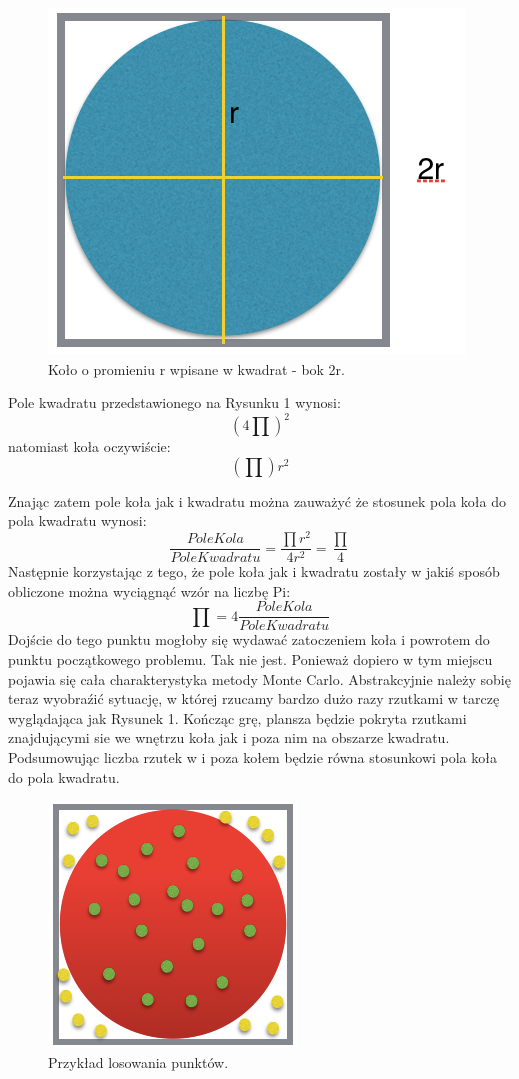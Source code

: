 \documentclass[a4paper,12pt]{article}		%
\begin{document}
\begin{figure}[h!]
\centering
\includegraphics[scale=0.5]{Resources/Kolo_rysunek.png}
\caption{Koło o promieniu r wpisane w kwadrat - bok 2r.}
\end{figure}

Pole kwadratu przedstawionego na Rysunku 1 wynosi:
 \[(4\prod)^{2}\]
 natomiast koła oczywiście:
 \[(\prod)r^{2}\]
 \newpage
 
 Znając zatem pole koła jak i kwadratu można zauważyć że stosunek pola koła do pola kwadratu wynosi:
\[ \frac{PoleKola}{PoleKwadratu}=\frac{\prod r^{2}}{4r^{2} }= \frac{\prod}{4}\]
Następnie korzystając z tego, że pole koła jak i kwadratu zostały w jakiś sposób obliczone można wyciągnąć wzór na liczbę Pi:
\[\prod =4\frac{PoleKola}{PoleKwadratu}\]
Dojście do tego punktu mogłoby się wydawać zatoczeniem koła i powrotem do punktu początkowego problemu. Tak nie jest. Ponieważ dopiero w tym miejscu pojawia się cała charakterystyka metody Monte Carlo. Abstrakcyjnie należy sobię teraz wyobraźić sytuację, w której rzucamy bardzo dużo razy rzutkami w tarczę wyglądająca jak Rysunek 1. Kończąc grę, plansza będzie pokryta rzutkami znajdującymi sie we wnętrzu koła jak i poza nim na obszarze kwadratu. Podsumowując liczba rzutek w i poza kołem będzie równa stosunkowi pola koła do pola kwadratu.

\begin{figure}[h!]
\centering
\includegraphics[scale=0.7]{Resources/Losowanie.png}
\caption{Przykład losowania punktów.}
\end{figure}
\end{document}
